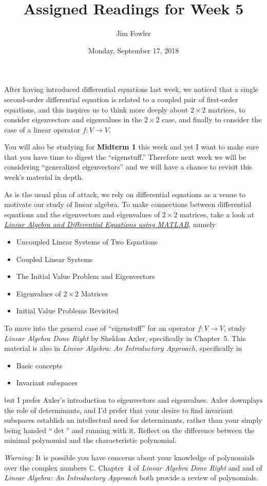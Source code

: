 \documentclass{homework}
\author{Jim Fowler}
\title{Assigned Readings for Week 5}
\date{Monday, September 17, 2018}
\begin{document}
\maketitle

After having introduced differential equations last week, we noticed
that a single second-order differential equation is related to a
coupled pair of first-order equations, and this inspires us to think
more deeply about $2 \times 2$ matrices, to consider eigenvectors and
eigenvalues in the $2 \times 2$ case, and finally to consider the case
of a linear operator $f : V \to V$.

You will also be studying for \textbf{Midterm 1} this week and yet I
want to make sure that you have time to digest the ``eigenstuff.''
Therefore next week we will be considering ``generalized
eigenvectors'' and we will have a chance to revisit this week's
material in depth.

As is the usual plan of attack, we rely on differential equations as a
venue to motivate our study of linear algebra.  To make connections
between differential equations and the eigenvectors and eigenvalues of
$2 \times 2$ matrices, take a look at
\textit{\href{/courses/43735/files/folder/textbooks}{Linear Algebra
    and Differential Equations using MATLAB}}, namely
\begin{itemize}
\item {} Uncoupled Linear Systems of Two Equations
\item {} Coupled Linear Systems
\item {} The Initial Value Problem and Eigenvectors
\item {} Eigenvalues of $2\times 2$ Matrices
\item {} Initial Value Problems Revisited  
\end{itemize}

To move into the general case of ``eigenstuff'' for an operator
$f : V \to V$, study \textit{Linear Algebra Done Right} by Sheldon
Axler, specifically in Chapter~5.  This material is also in
\textit{Linear Algebra: An Introductory Approach}, specifically in
\begin{itemize}
\item {} Basic concepts
\item {} Invariant subspaces
\end{itemize}
but I prefer Axler's introduction to eigenvectors and eigenvalues.
Axler downplays the role of determinants, and I'd prefer that your
desire to find invariant subspaces establish an intellectual need for
determinants, rather than your simply being handed ``$\det$'' and
running with it.  Reflect on the difference between the minimal
polynomial and the characteristic polynomial.

\textit{Warning:} It is possible you have concerns about your
knowledge of polynomials over the complex numbers $\mathbb{C}$.
Chapter~4 of \textit{Linear Algebra Done Right} and 
and  of \textit{Linear Algebra: An Introductory
  Approach} both provide a review of polynomials.
\end{document}
